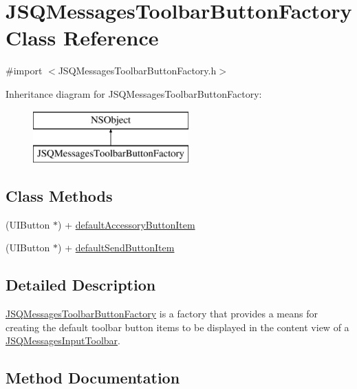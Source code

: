\hypertarget{interface_j_s_q_messages_toolbar_button_factory}{}\section{J\+S\+Q\+Messages\+Toolbar\+Button\+Factory Class Reference}
\label{interface_j_s_q_messages_toolbar_button_factory}


{\ttfamily \#import $<$J\+S\+Q\+Messages\+Toolbar\+Button\+Factory.\+h$>$}

Inheritance diagram for J\+S\+Q\+Messages\+Toolbar\+Button\+Factory\+:\begin{figure}[H]
\begin{center}
\leavevmode
\includegraphics[height=2.000000cm]{interface_j_s_q_messages_toolbar_button_factory}
\end{center}
\end{figure}
\subsection*{Class Methods}
\begin{DoxyCompactItemize}
\item 
(U\+I\+Button $\ast$) + \hyperlink{interface_j_s_q_messages_toolbar_button_factory_a6a6231038ee5ea2bcba19331e7cc56ae}{default\+Accessory\+Button\+Item}
\item 
(U\+I\+Button $\ast$) + \hyperlink{interface_j_s_q_messages_toolbar_button_factory_af5a3462d703b07b8eff1cee3516f7e64}{default\+Send\+Button\+Item}
\end{DoxyCompactItemize}


\subsection{Detailed Description}
{\ttfamily \hyperlink{interface_j_s_q_messages_toolbar_button_factory}{J\+S\+Q\+Messages\+Toolbar\+Button\+Factory}} is a factory that provides a means for creating the default toolbar button items to be displayed in the content view of a {\ttfamily \hyperlink{interface_j_s_q_messages_input_toolbar}{J\+S\+Q\+Messages\+Input\+Toolbar}}. 

\subsection{Method Documentation}
\hypertarget{interface_j_s_q_messages_toolbar_button_factory_a6a6231038ee5ea2bcba19331e7cc56ae}{}
